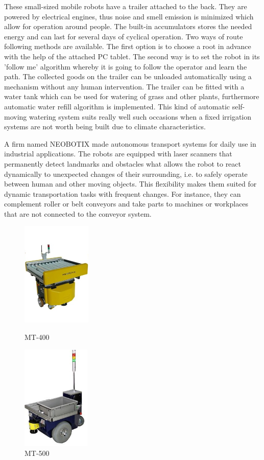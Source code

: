 \documentclass[12pt,english]{article}
\begin{document}
\noindent These small-sized mobile robots have a trailer attached to the back. They are powered by electrical engines, thus noise and smell emission is minimized which allow for operation around people. The built-in accumulators stores the needed energy and can last for several days of cyclical operation. Two ways of route following methods are available. The first option is to choose a root in advance with the help of the attached PC tablet. The second way is to set the robot in its 'follow me' algorithm whereby it is going to follow the operator and learn the path. The collected goods on the trailer can be unloaded automatically using a mechanism without any human intervention. The trailer can be fitted with a water tank which can be used for watering of grass and other plants, furthermore automatic water refill algorithm is implemented. This kind of automatic self-moving watering system suits really well such occasions when a fixed irrigation systems are not worth being built due to climate characteristics.\cite{smp}

A firm named NEOBOTIX made autonomous transport systems for daily use in industrial applications. The robots are equipped with laser scanners that permanently detect landmarks and obstacles what allows the robot to react dynamically to unexpected changes of their surrounding, i.e. to safely operate between human and other moving objects. This flexibility makes them suited for dynamic transportation tasks with frequent changes. For instance, they can complement roller or belt conveyors and take parts to machines or workplaces that are not connected to the conveyor system. \cite{neo}

\begin{figure}[htb!]
	\centering
	\centering
	\includegraphics[height=5cm]{figures/neo1.jpg}
	\caption{{\small MT-400}}
	\endminipage\hfill
	\centering
	\includegraphics[height=5cm]{figures/neo2.jpg}
	\caption{{\small MT-500}}
	\label{conv2}
	\endminipage\hfill
\end{figure} 
\end{document}
